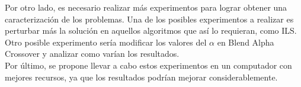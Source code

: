 \documentclass{ci5652}
\begin{document}
Por otro lado, es necesario realizar más experimentos para lograr obtener una caracterización de los problemas. Una de los posibles experimentos a realizar es perturbar más la solución en aquellos algoritmos que así lo requieran, como ILS. Otro posible experimento sería modificar los valores del $\alpha$ en Blend Alpha Crossover y analizar como varían los resultados.\\

Por último, se propone llevar a cabo estos experimentos en un computador con mejores recursos, ya que los resultados podrían mejorar considerablemente.


\newpage
\small

\end{document}
